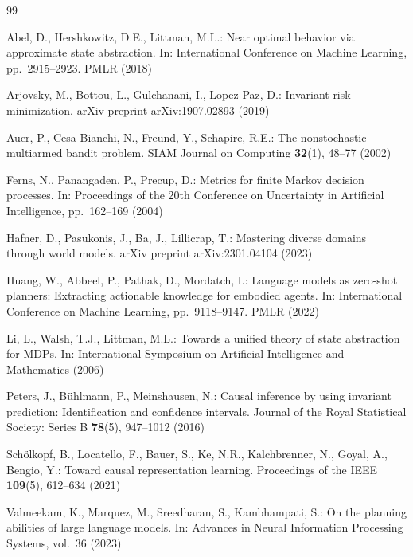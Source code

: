 \documentclass[runningheads]{llncs}
\begin{document}
\begin{thebibliography}{99}

Abel, D., Hershkowitz, D.E., Littman, M.L.:
Near optimal behavior via approximate state abstraction.
In: International Conference on Machine Learning, pp.~2915--2923. PMLR (2018)

Arjovsky, M., Bottou, L., Gulchanani, I., Lopez-Paz, D.:
Invariant risk minimization.
arXiv preprint arXiv:1907.02893 (2019)

Auer, P., Cesa-Bianchi, N., Freund, Y., Schapire, R.E.:
The nonstochastic multiarmed bandit problem.
SIAM Journal on Computing \textbf{32}(1), 48--77 (2002)

Ferns, N., Panangaden, P., Precup, D.:
Metrics for finite Markov decision processes.
In: Proceedings of the 20th Conference on Uncertainty in Artificial Intelligence, pp.~162--169 (2004)

Hafner, D., Pasukonis, J., Ba, J., Lillicrap, T.:
Mastering diverse domains through world models.
arXiv preprint arXiv:2301.04104 (2023)

Huang, W., Abbeel, P., Pathak, D., Mordatch, I.:
Language models as zero-shot planners: Extracting actionable knowledge for embodied agents.
In: International Conference on Machine Learning, pp.~9118--9147. PMLR (2022)

Li, L., Walsh, T.J., Littman, M.L.:
Towards a unified theory of state abstraction for MDPs.
In: International Symposium on Artificial Intelligence and Mathematics (2006)

Peters, J., B{\"u}hlmann, P., Meinshausen, N.:
Causal inference by using invariant prediction: Identification and confidence intervals.
Journal of the Royal Statistical Society: Series B \textbf{78}(5), 947--1012 (2016)

Sch{\"o}lkopf, B., Locatello, F., Bauer, S., Ke, N.R., Kalchbrenner, N., Goyal, A., Bengio, Y.:
Toward causal representation learning.
Proceedings of the IEEE \textbf{109}(5), 612--634 (2021)

Valmeekam, K., Marquez, M., Sreedharan, S., Kambhampati, S.:
On the planning abilities of large language models.
In: Advances in Neural Information Processing Systems, vol.~36 (2023)


\end{thebibliography}
\end{document}
